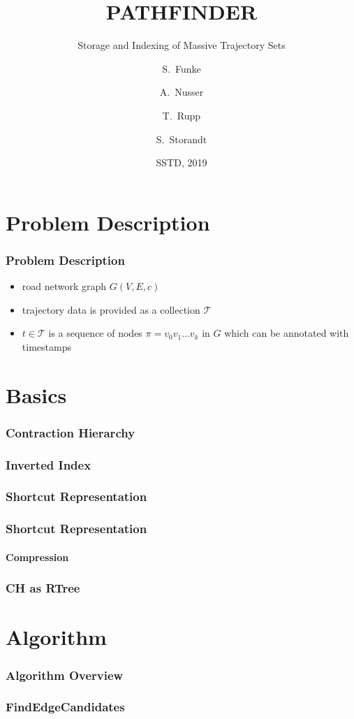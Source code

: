 \documentclass{beamer}
\title[Pathfinder] %
{PATHFINDER}
\subtitle{Storage and Indexing of Massive Trajectory Sets}
\author[Funke, Nusser, Rupp, Storandt] %
{S.~Funke\inst{1} \and A.~Nusser\inst{2} \and T.~Rupp\inst{3} \and S.~Storandt\inst{4}}
\institute[Universities] %
{
	\inst{1}%
	University of Stuttgart
	\and
	\inst{2}%
	Max Planck Institute for Informatics
	\and
	\inst{3}%
	University of Stuttgart
	\and
	\inst{4}%
	University of Konstanz
}
\date[SSTD 2019] %
{SSTD, 2019}
\begin{document}
\frame{\titlepage}

\frame{\tableofcontents}

\section{Problem Description}
\begin{frame}
	\frametitle{Problem Description}
	\begin{itemize}
		\item<1-> road network graph $G(V,E,c)$
		\item<2->  trajectory data is provided as a collection $\mathcal{T}$
		\item<3-> $t\in \mathcal{T}$ is a sequence of nodes $\pi=v_0 v_1 \dots v_k$ in  $G$ which can be annotated with timestamps
	\end{itemize}
\end{frame}

\section{Basics}
\begin{frame}
	\frametitle{Contraction Hierarchy}
\end{frame}

\begin{frame}
	\frametitle{Inverted Index}
\end{frame}

\begin{frame}
	\frametitle{Shortcut Representation}
\end{frame}

\begin{frame}
	\frametitle{Shortcut Representation}
	\framesubtitle{Compression}
\end{frame}

\begin{frame}
	\frametitle{CH as RTree}
\end{frame}

\section{Algorithm}

\begin{frame}
	\frametitle{Algorithm Overview}
\end{frame}

\begin{frame}
	\frametitle{FindEdgeCandidates}
\end{frame}
\end{document}
